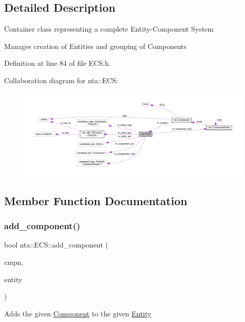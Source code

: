 \subsection{Detailed Description}
Container class representing a complete Entity-\/\+Component System

Manages creation of Entities and grouping of Components 

Definition at line 84 of file E\+C\+S.\+h.



Collaboration diagram for nta\+:\+:E\+CS\+:
\nopagebreak
\begin{figure}[H]
\begin{center}
\leavevmode
\includegraphics[width=350pt]{d5/d5c/classnta_1_1ECS__coll__graph}
\end{center}
\end{figure}


\subsection{Member Function Documentation}
\mbox{\label{classnta_1_1ECS_a3388e8ae1ef45258356c742efcc00048}} 
\subsubsection{\texorpdfstring{add\+\_\+component()}{add\_component()}}
{\footnotesize\ttfamily bool nta\+::\+E\+C\+S\+::add\+\_\+component (\begin{DoxyParamCaption}\item[{\hyperlink{classnta_1_1Component}{Component} $\ast$}]{cmpn,  }\item[{Entity\+ID}]{entity }\end{DoxyParamCaption})}

Adds the given \hyperlink{classnta_1_1Component}{Component} to the given \hyperlink{classnta_1_1Entity}{Entity}

